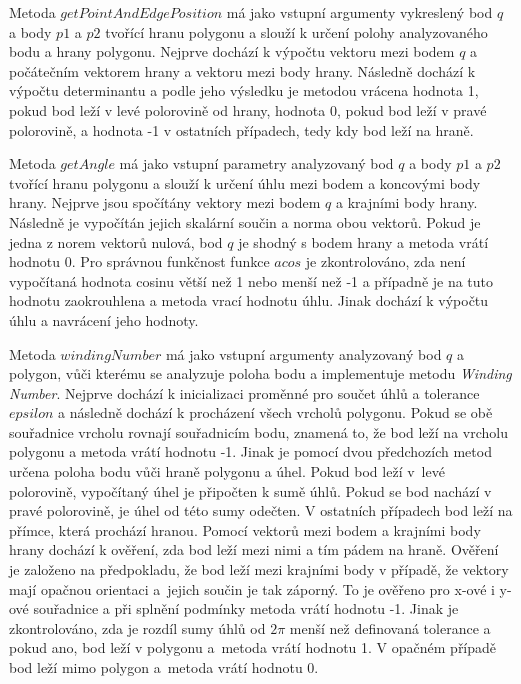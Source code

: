 \documentclass[15pt]{article}
\begin{document}
\begin{spacing}{1.5}
\noindent Metoda $getPointAndEdgePosition$ má jako vstupní argumenty vykreslený bod $q$ a body $p1$ a $p2$ tvořící hranu polygonu a slouží k určení polohy analyzovaného bodu a hrany polygonu. Nejprve dochází k výpočtu vektoru mezi bodem $q$ a počátečním vektorem hrany a vektoru mezi body hrany. Následně dochází k výpočtu determinantu a podle jeho výsledku je metodou vrácena hodnota 1, pokud bod leží v levé polorovině od hrany, hodnota 0, pokud bod leží v pravé polorovině, a hodnota -1 v ostatních případech, tedy kdy bod leží na hraně.

\noindent Metoda $getAngle$ má jako vstupní parametry analyzovaný bod $q$ a body $p1$ a $p2$ tvořící hranu polygonu a slouží k určení úhlu mezi bodem a koncovými body hrany. Nejprve jsou spočítány vektory mezi bodem $q$ a krajními body hrany. Následně je vypočítán jejich skalární součin a norma obou vektorů. Pokud je jedna z norem vektorů nulová, bod $q$ je shodný s bodem hrany a metoda vrátí hodnotu 0. Pro správnou funkčnost funkce $acos$ je zkontrolováno, zda není vypočítaná hodnota cosinu větší než 1 nebo menší než -1 a případně je na tuto hodnotu zaokrouhlena a metoda vrací hodnotu úhlu. Jinak dochází k výpočtu úhlu a navrácení jeho hodnoty.

\noindent Metoda $windingNumber$ má jako vstupní argumenty analyzovaný bod $q$ a polygon, vůči kterému se analyzuje poloha bodu a implementuje metodu \textit{Winding Number}. Nejprve dochází k inicializaci proměnné pro součet úhlů a tolerance $epsilon$ a následně dochází k procházení všech vrcholů polygonu. Pokud se obě souřadnice vrcholu rovnají souřadnicím bodu, znamená to, že bod leží na vrcholu polygonu a metoda vrátí hodnotu -1. Jinak je pomocí dvou předchozích metod určena poloha bodu vůči hraně polygonu a úhel. Pokud bod leží v levé polorovině, vypočítaný úhel je připočten k sumě úhlů. Pokud se bod nachází v pravé polorovině, je úhel od této sumy odečten. V ostatních případech bod leží na přímce, která prochází hranou. Pomocí vektorů mezi bodem a krajními body hrany dochází k ověření, zda bod leží mezi nimi a tím pádem na hraně. Ověření je založeno na předpokladu, že bod leží mezi krajními body v případě, že vektory mají opačnou orientaci a jejich součin je tak záporný. To je ověřeno pro x-ové i y-ové souřadnice a při splnění podmínky metoda vrátí hodnotu -1. Jinak je zkontrolováno, zda je rozdíl sumy úhlů od $2\pi$ menší než definovaná tolerance a pokud ano, bod leží v polygonu a metoda vrátí hodnotu 1. V opačném případě bod leží mimo polygon a metoda vrátí hodnotu 0.


\end{spacing}
\end{document}
